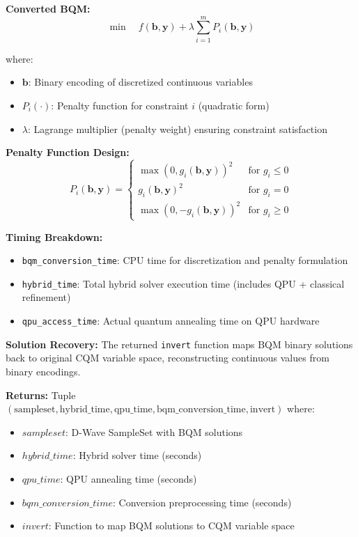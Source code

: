\documentclass{article}
\begin{document}
\textbf{Converted BQM:}
$$\min \quad f(\mathbf{b}, \mathbf{y}) + \lambda \sum_{i=1}^m P_i(\mathbf{b}, \mathbf{y})$$

where:
\begin{itemize}
    \item $\mathbf{b}$: Binary encoding of discretized continuous variables
    \item $P_i(\cdot)$: Penalty function for constraint $i$ (quadratic form)
    \item $\lambda$: Lagrange multiplier (penalty weight) ensuring constraint satisfaction
\end{itemize}

\textbf{Penalty Function Design:}
$$P_i(\mathbf{b}, \mathbf{y}) = \begin{cases}
\max(0, g_i(\mathbf{b}, \mathbf{y}))^2 & \text{for } g_i \leq 0 \\
g_i(\mathbf{b}, \mathbf{y})^2 & \text{for } g_i = 0 \\
\max(0, -g_i(\mathbf{b}, \mathbf{y}))^2 & \text{for } g_i \geq 0
\end{cases}$$

\textbf{Timing Breakdown:}
\begin{itemize}
    \item \texttt{bqm\_conversion\_time}: CPU time for discretization and penalty formulation
    \item \texttt{hybrid\_time}: Total hybrid solver execution time (includes QPU + classical refinement)
    \item \texttt{qpu\_access\_time}: Actual quantum annealing time on QPU hardware
\end{itemize}

\textbf{Solution Recovery:} The returned \texttt{invert} function maps BQM binary solutions back to original CQM variable space, reconstructing continuous values from binary encodings.

\textbf{Returns:} Tuple $(\text{sampleset}, \text{hybrid\_time}, \text{qpu\_time}, \text{bqm\_conversion\_time}, \text{invert})$ where:
\begin{itemize}
    \item $sampleset$: D-Wave SampleSet with BQM solutions
    \item $hybrid\_time$: Hybrid solver time (seconds)
    \item $qpu\_time$: QPU annealing time (seconds)
    \item $bqm\_conversion\_time$: Conversion preprocessing time (seconds)
    \item $invert$: Function to map BQM solutions to CQM variable space
\end{itemize}
\end{document}
